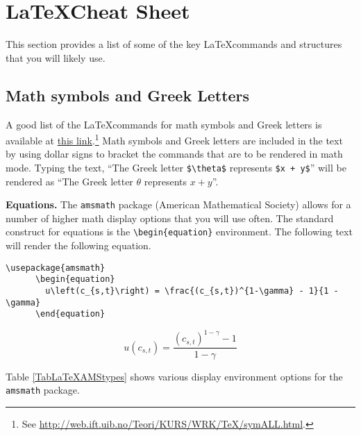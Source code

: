 \section{\LaTeX\space Cheat Sheet}\label{SecLaTeXCheat}

  This section provides a list of some of the key \LaTeX commands and structures that you will likely use.

  \subsection{Math symbols and Greek Letters}

    A good list of the \LaTeX commands for math symbols and Greek letters is available at \href{http://web.ift.uib.no/Teori/KURS/WRK/TeX/symALL.html}{this link}.\footnote{See \href{http://web.ift.uib.no/Teori/KURS/WRK/TeX/symALL.html}{http://web.ift.uib.no/Teori/KURS/WRK/TeX/symALL.html}.} Math symbols and Greek letters are included in the text by using dollar signs to bracket the commands that are to be rendered in math mode. Typing the text, ``The Greek letter \verb|$\theta$| represents \verb|$x + y$|'' will be rendered as ``The Greek letter $\theta$ represents $x + y$''.

    \textbf{Equations.} The \texttt{amsmath} package (American Mathematical Society) allows for a number of higher math display options that you will use often. The standard construct for equations is the \verb|\begin{equation}| environment. The following text will render the following equation.

    \begin{lstlisting}[frame=single]
      \usepackage{amsmath}
      \begin{equation}
        u\left(c_{s,t}\right) = \frac{(c_{s,t})^{1-\gamma} - 1}{1 - \gamma}
      \end{equation}
    \end{lstlisting}
    \begin{equation}\tag{1}
      u\left(c_{s,t}\right) = \frac{(c_{s,t})^{1-\gamma} - 1}{1 - \gamma}
    \end{equation}

    \noindent Table \ref{TabLaTeXAMStypes} shows various display environment options for the \texttt{amsmath} package.

